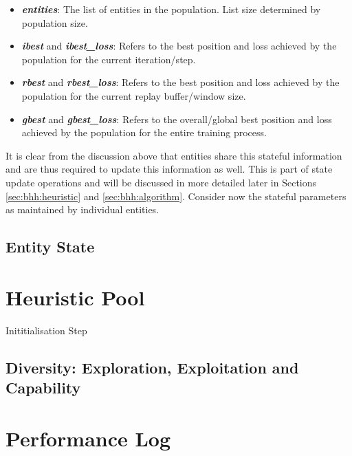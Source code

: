 \begin{itemize}
    \item \textbf{\textit{entities}}: The list of entities in the population. List size determined by population size.
    \item \textbf{\textit{ibest}} and \textbf{\textit{ibest\_loss}}: Refers to the best position and loss achieved by the population for the current iteration/step.
    \item \textbf{\textit{rbest}} and \textbf{\textit{rbest\_loss}}: Refers to the best position and loss achieved by the population for the current replay buffer/window size.
    \item \textbf{\textit{gbest}} and \textbf{\textit{gbest\_loss}}: Refers to the overall/global best position and loss achieved by the population for the entire training process.
\end{itemize}

It is clear from the discussion above that entities share this stateful information and are thus required to update this information as well. This is part of state update operations and will be discussed in more detailed later in Sections \ref{sec:bhh:heuristic} and \ref{sec:bhh:algorithm}. Consider now the stateful parameters as maintained by individual entities.


\subsection{Entity State}
\label{sec:bhh:entity_pool:entity_state}

\section{Heuristic Pool}
\label{sec:bhh:heuristic_pool}

Inititialisation
Step

\subsection{Diversity: Exploration, Exploitation and Capability}
\label{sec:bhh:entity_pool:diversity}


\section{Performance Log}
\label{sec:bhh:performance_log}

